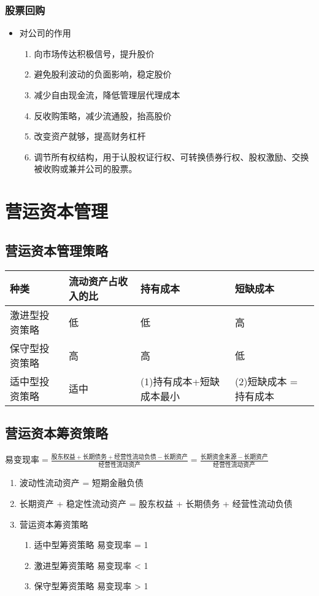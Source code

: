 \documentclass[11pt]{article}
\begin{document}
\subsubsection{股票回购}
\label{sec:org33fac71}
\begin{itemize}
\item 对公司的作用
\begin{enumerate}
\item 向市场传达积极信号，提升股价
\item 避免股利波动的负面影响，稳定股价
\item 减少自由现金流，降低管理层代理成本
\item 反收购策略，减少流通股，抬高股价
\item 改变资产就够，提高财务杠杆
\item 调节所有权结构，用于认股权证行权、可转换债券行权、股权激励、交换被收购或兼并公司的股票。
\end{enumerate}
\end{itemize}

\section{营运资本管理}
\label{sec:org9bedc98}
\subsection{营运资本管理策略}
\label{sec:orgda249af}
\begin{center}
\begin{tabular}{llll}
种类 & 流动资产占收入的比 & 持有成本 & 短缺成本\\
\hline
激进型投资策略 & 低 & 低 & 高\\
保守型投资策略 & 高 & 高 & 低\\
适中型投资策略 & 适中 & (1)持有成本+短缺成本最小 & (2)短缺成本 = 持有成本\\
\end{tabular}
\end{center}
\subsection{营运资本筹资策略}
\label{sec:org0cff639}
\(易变现率 = \frac{股东权益 + 长期债务 + 经营性流动负债 - 长期资产}{经营性流动资产} = \frac{长期资金来源-长期资产}{经营性流动资产}\)
\begin{enumerate}
\item 波动性流动资产 = 短期金融负债
\item 长期资产 + 稳定性流动资产 = 股东权益 + 长期债务 + 经营性流动负债
\item 营运资本筹资策略
\begin{enumerate}
\item 适中型筹资策略
易变现率 = 1
\item 激进型筹资策略
易变现率 < 1
\item 保守型筹资策略
易变现率 > 1
\end{enumerate}
\end{enumerate}
\end{document}
